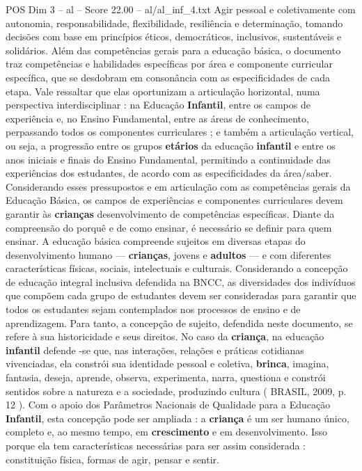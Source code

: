 \begin{textsample}{POS Dim 3 – al – Score 22.00 – al/al\_inf\_4.txt}
Agir pessoal e coletivamente com autonomia, responsabilidade, flexibilidade, resiliência e determinação, tomando decisões com base em princípios éticos, democráticos, inclusivos, sustentáveis e solidários.
Além das competências gerais para a educação básica, o documento traz competências e habilidades específicas por área e componente curricular específica, que se desdobram em consonância com as especificidades de cada etapa.
Vale ressaltar que elas oportunizam a articulação horizontal, numa perspectiva interdisciplinar : na Educação \textbf{Infantil}, entre os campos de experiência e, no Ensino Fundamental, entre as áreas de conhecimento, perpassando todos os componentes curriculares ; e também a articulação vertical, ou seja, a progressão entre os grupos \textbf{etários} da educação \textbf{infantil} e entre os anos iniciais e finais do Ensino Fundamental, permitindo a continuidade das experiências dos estudantes, de acordo com as especificidades da área/saber.
Considerando esses pressupostos e em articulação com as competências gerais da Educação Básica, os campos de experiências e componentes curriculares devem garantir às \textbf{crianças} desenvolvimento de competências específicas.
Diante da compreensão do porquê e de como ensinar, é necessário se definir para quem ensinar.
A educação básica compreende sujeitos em diversas etapas do desenvolvimento humano — \textbf{crianças}, jovens e \textbf{adultos} — e com diferentes características físicas, sociais, intelectuais e culturais.
Considerando a concepção de educação integral inclusiva defendida na BNCC, as diversidades dos indivíduos que compõem cada grupo de estudantes devem ser consideradas para garantir que todos os estudantes sejam contemplados nos processos de ensino e de aprendizagem.
Para tanto, a concepção de sujeito, defendida neste documento, se refere à sua historicidade e seus direitos.
No caso da \textbf{criança}, na educação \textbf{infantil} defende -se que, nas interações, relações e práticas cotidianas vivenciadas, ela constrói sua identidade pessoal e coletiva, \textbf{brinca}, imagina, fantasia, deseja, aprende, observa, experimenta, narra, questiona e constrói sentidos sobre a natureza e a sociedade, produzindo cultura ( BRASIL, 2009, p. 12 ).
Com o apoio dos Parâmetros Nacionais de Qualidade para a Educação \textbf{Infantil}, esta concepção pode ser ampliada : a \textbf{criança} é um ser humano único, completo e, ao mesmo tempo, em \textbf{crescimento} e em desenvolvimento.
Isso porque ela tem características necessárias para ser assim considerada : constituição física, formas de agir, pensar e sentir.

\end{textsample}
